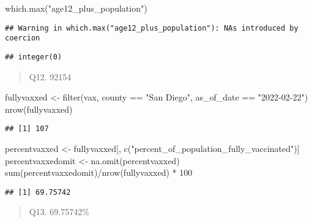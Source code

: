\documentclass[
]{article}
\newenvironment{Shaded}{\begin{snugshade}}{\end{snugshade}}
\newcommand{\DecValTok}[1]{\textcolor[rgb]{0.00,0.00,0.81}{#1}}
\newcommand{\FunctionTok}[1]{\textcolor[rgb]{0.00,0.00,0.00}{#1}}
\newcommand{\NormalTok}[1]{#1}
\newcommand{\OtherTok}[1]{\textcolor[rgb]{0.56,0.35,0.01}{#1}}
\newcommand{\SpecialCharTok}[1]{\textcolor[rgb]{0.00,0.00,0.00}{#1}}
\newcommand{\StringTok}[1]{\textcolor[rgb]{0.31,0.60,0.02}{#1}}
\begin{document}
\begin{Shaded}
\begin{Highlighting}[]
\FunctionTok{which.max}\NormalTok{(}\StringTok{"age12\_plus\_population"}\NormalTok{)}
\end{Highlighting}
\end{Shaded}

\begin{verbatim}
## Warning in which.max("age12_plus_population"): NAs introduced by coercion
\end{verbatim}

\begin{verbatim}
## integer(0)
\end{verbatim}

\begin{quote}
Q12. 92154
\end{quote}

\begin{Shaded}
\begin{Highlighting}[]
\NormalTok{fullyvaxxed }\OtherTok{\textless{}{-}} \FunctionTok{filter}\NormalTok{(vax, county }\SpecialCharTok{==} \StringTok{"San Diego"}\NormalTok{, as\_of\_date }\SpecialCharTok{==} \StringTok{"2022{-}02{-}22"}\NormalTok{)}
\FunctionTok{nrow}\NormalTok{(fullyvaxxed)}
\end{Highlighting}
\end{Shaded}

\begin{verbatim}
## [1] 107
\end{verbatim}

\begin{Shaded}
\begin{Highlighting}[]
\NormalTok{percentvaxxed }\OtherTok{\textless{}{-}}\NormalTok{ fullyvaxxed[, }\FunctionTok{c}\NormalTok{(}\StringTok{"percent\_of\_population\_fully\_vaccinated"}\NormalTok{)]}
\NormalTok{percentvaxxedomit }\OtherTok{\textless{}{-}} \FunctionTok{na.omit}\NormalTok{(percentvaxxed)}
\FunctionTok{sum}\NormalTok{(percentvaxxedomit)}\SpecialCharTok{/}\FunctionTok{nrow}\NormalTok{(fullyvaxxed) }\SpecialCharTok{*} \DecValTok{100}
\end{Highlighting}
\end{Shaded}

\begin{verbatim}
## [1] 69.75742
\end{verbatim}

\begin{quote}
Q13. 69.75742\%
\end{quote}
\end{document}
